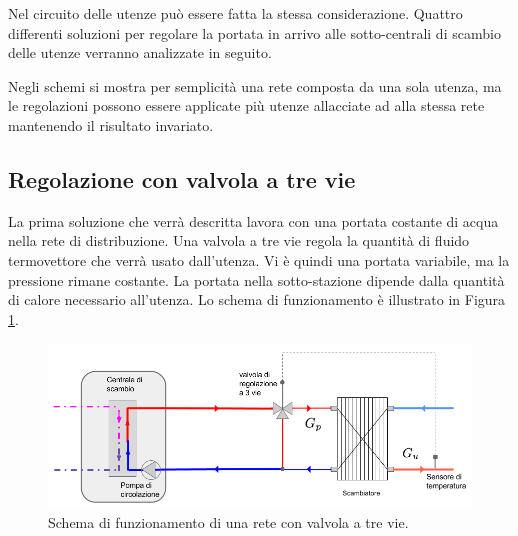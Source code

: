 \documentclass[laurea,oneside,11pt]{USiena_tesiLM}
\begin{document}
Nel circuito delle utenze può essere fatta la stessa considerazione. Quattro differenti soluzioni per regolare la portata in arrivo alle sotto-centrali di scambio delle utenze verranno analizzate in seguito.

Negli schemi si mostra per semplicità una rete composta da una sola utenza, ma le regolazioni possono essere applicate più utenze allacciate ad alla stessa rete mantenendo il risultato invariato.

\subsection{Regolazione con valvola a tre vie}
\label{subsec:3vie}
La prima soluzione che verrà descritta lavora con una portata costante di acqua nella rete di distribuzione. Una valvola a tre vie regola la quantità di fluido termovettore che verrà usato dall'utenza. Vi è quindi una portata variabile, ma la pressione rimane costante. La portata nella sotto-stazione dipende dalla quantità di calore necessario all'utenza.  Lo schema di funzionamento è illustrato in Figura \ref{fig:3vie}.

\begin{figure}[!ht]
\centering
\includegraphics[width=\textwidth]{figure/3vie}
\caption{Schema di funzionamento di una rete con valvola a tre vie.}
\label{fig:3vie}

\end{figure}
\end{document}
